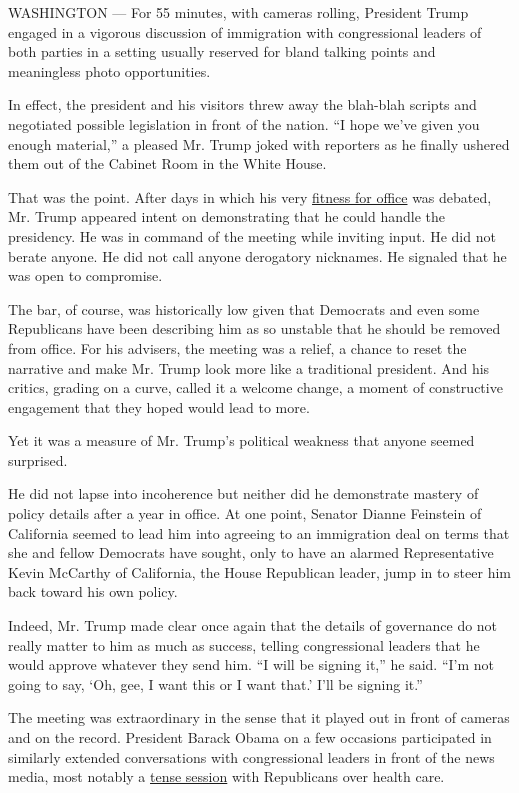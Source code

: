 WASHINGTON --- For 55 minutes, with cameras rolling, President Trump
engaged in a vigorous discussion of immigration with congressional
leaders of both parties in a setting usually reserved for bland talking
points and meaningless photo opportunities.

In effect, the president and his visitors threw away the blah-blah
scripts and negotiated possible legislation in front of the nation. ``I
hope we've given you enough material,'' a pleased Mr. Trump joked with
reporters as he finally ushered them out of the Cabinet Room in the
White House.

That was the point. After days in which his very
\href{https://www.nytimes3xbfgragh.onion/2018/01/06/us/politics/trump-genius-mental-health.html}{fitness
for office} was debated, Mr. Trump appeared intent on demonstrating that
he could handle the presidency. He was in command of the meeting while
inviting input. He did not berate anyone. He did not call anyone
derogatory nicknames. He signaled that he was open to compromise.

The bar, of course, was historically low given that Democrats and even
some Republicans have been describing him as so unstable that he should
be removed from office. For his advisers, the meeting was a relief, a
chance to reset the narrative and make Mr. Trump look more like a
traditional president. And his critics, grading on a curve, called it a
welcome change, a moment of constructive engagement that they hoped
would lead to more.

Yet it was a measure of Mr. Trump's political weakness that anyone
seemed surprised.

He did not lapse into incoherence but neither did he demonstrate mastery
of policy details after a year in office. At one point, Senator Dianne
Feinstein of California seemed to lead him into agreeing to an
immigration deal on terms that she and fellow Democrats have sought,
only to have an alarmed Representative Kevin McCarthy of California, the
House Republican leader, jump in to steer him back toward his own
policy.

Indeed, Mr. Trump made clear once again that the details of governance
do not really matter to him as much as success, telling congressional
leaders that he would approve whatever they send him. ``I will be
signing it,'' he said. ``I'm not going to say, `Oh, gee, I want this or
I want that.' I'll be signing it.''

The meeting was extraordinary in the sense that it played out in front
of cameras and on the record. President Barack Obama on a few occasions
participated in similarly extended conversations with congressional
leaders in front of the news media, most notably a
\href{http://www.nytimes3xbfgragh.onion/2010/02/26/health/policy/26health.html}{tense
session} with Republicans over health care.

